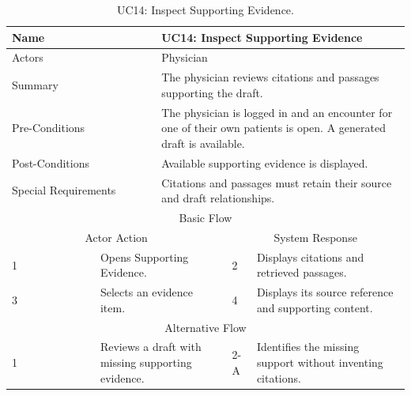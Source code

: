 \begin{table}[htbp]
\centering
\small
\caption{UC14: Inspect Supporting Evidence.}
\label{tab:kashaf:uc14}
\begin{tabular}{|p{}|p{}|p{}|p{}|p{}|}
\hline
\multicolumn{2}{|p{\dimexpr0.225\textwidth+2\tabcolsep+\arrayrulewidth\relax}|}{Name} & \multicolumn{3}{p{\dimexpr0.575\textwidth+4\tabcolsep+2\arrayrulewidth\relax}|}{UC14: Inspect Supporting Evidence} \\ \hline
\multicolumn{2}{|p{\dimexpr0.225\textwidth+2\tabcolsep+\arrayrulewidth\relax}|}{Actors} & \multicolumn{3}{p{\dimexpr0.575\textwidth+4\tabcolsep+2\arrayrulewidth\relax}|}{Physician} \\ \hline
\multicolumn{2}{|p{\dimexpr0.225\textwidth+2\tabcolsep+\arrayrulewidth\relax}|}{Summary} & \multicolumn{3}{p{\dimexpr0.575\textwidth+4\tabcolsep+2\arrayrulewidth\relax}|}{The physician reviews citations and passages supporting the draft.} \\ \hline
\multicolumn{2}{|p{\dimexpr0.225\textwidth+2\tabcolsep+\arrayrulewidth\relax}|}{Pre-Conditions} & \multicolumn{3}{p{\dimexpr0.575\textwidth+4\tabcolsep+2\arrayrulewidth\relax}|}{The physician is logged in and an encounter for one of their own patients is open. A generated draft is available.} \\ \hline
\multicolumn{2}{|p{\dimexpr0.225\textwidth+2\tabcolsep+\arrayrulewidth\relax}|}{Post-Conditions} & \multicolumn{3}{p{\dimexpr0.575\textwidth+4\tabcolsep+2\arrayrulewidth\relax}|}{Available supporting evidence is displayed.} \\ \hline
\multicolumn{2}{|p{\dimexpr0.225\textwidth+2\tabcolsep+\arrayrulewidth\relax}|}{Special Requirements} & \multicolumn{3}{p{\dimexpr0.575\textwidth+4\tabcolsep+2\arrayrulewidth\relax}|}{Citations and passages must retain their source and draft relationships.} \\ \hline
\multicolumn{5}{|c|}{Basic Flow} \\ \hline
\multicolumn{3}{|c|}{Actor Action} & \multicolumn{2}{c|}{System Response} \\ \hline
1 & \multicolumn{2}{p{\dimexpr0.37\textwidth+2\tabcolsep+\arrayrulewidth\relax}|}{Opens Supporting Evidence.} & 2 & Displays citations and retrieved passages. \\ \hline
3 & \multicolumn{2}{p{\dimexpr0.37\textwidth+2\tabcolsep+\arrayrulewidth\relax}|}{Selects an evidence item.} & 4 & Displays its source reference and supporting content. \\ \hline
\multicolumn{5}{|c|}{Alternative Flow} \\ \hline
1 & \multicolumn{2}{p{\dimexpr0.37\textwidth+2\tabcolsep+\arrayrulewidth\relax}|}{Reviews a draft with missing supporting evidence.} & 2-A & Identifies the missing support without inventing citations. \\ \hline
\end{tabular}
\end{table}

